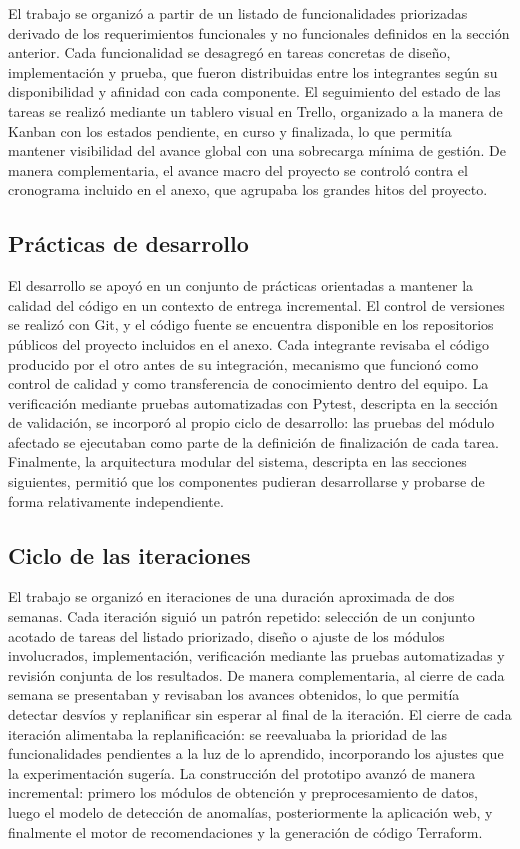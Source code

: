 El trabajo se organizó a partir de un listado de funcionalidades priorizadas derivado de los requerimientos funcionales y no funcionales definidos en la sección anterior. Cada funcionalidad se desagregó en tareas concretas de diseño, implementación y prueba, que fueron distribuidas entre los integrantes según su disponibilidad y afinidad con cada componente. El seguimiento del estado de las tareas se realizó mediante un tablero visual en Trello, organizado a la manera de Kanban con los estados pendiente, en curso y finalizada, lo que permitía mantener visibilidad del avance global con una sobrecarga mínima de gestión. De manera complementaria, el avance macro del proyecto se controló contra el cronograma incluido en el anexo, que agrupaba los grandes hitos del proyecto.

\subsection{Prácticas de desarrollo}

El desarrollo se apoyó en un conjunto de prácticas orientadas a mantener la calidad del código en un contexto de entrega incremental. El control de versiones se realizó con Git, y el código fuente se encuentra disponible en los repositorios públicos del proyecto incluidos en el anexo. Cada integrante revisaba el código producido por el otro antes de su integración, mecanismo que funcionó como control de calidad y como transferencia de conocimiento dentro del equipo. La verificación mediante pruebas automatizadas con Pytest, descripta en la sección de validación, se incorporó al propio ciclo de desarrollo: las pruebas del módulo afectado se ejecutaban como parte de la definición de finalización de cada tarea. Finalmente, la arquitectura modular del sistema, descripta en las secciones siguientes, permitió que los componentes pudieran desarrollarse y probarse de forma relativamente independiente.

\subsection{Ciclo de las iteraciones}

El trabajo se organizó en iteraciones de una duración aproximada de dos semanas. Cada iteración siguió un patrón repetido: selección de un conjunto acotado de tareas del listado priorizado, diseño o ajuste de los módulos involucrados, implementación, verificación mediante las pruebas automatizadas y revisión conjunta de los resultados. De manera complementaria, al cierre de cada semana se presentaban y revisaban los avances obtenidos, lo que permitía detectar desvíos y replanificar sin esperar al final de la iteración. El cierre de cada iteración alimentaba la replanificación: se reevaluaba la prioridad de las funcionalidades pendientes a la luz de lo aprendido, incorporando los ajustes que la experimentación sugería. La construcción del prototipo avanzó de manera incremental: primero los módulos de obtención y preprocesamiento de datos, luego el modelo de detección de anomalías, posteriormente la aplicación web, y finalmente el motor de recomendaciones y la generación de código Terraform.

